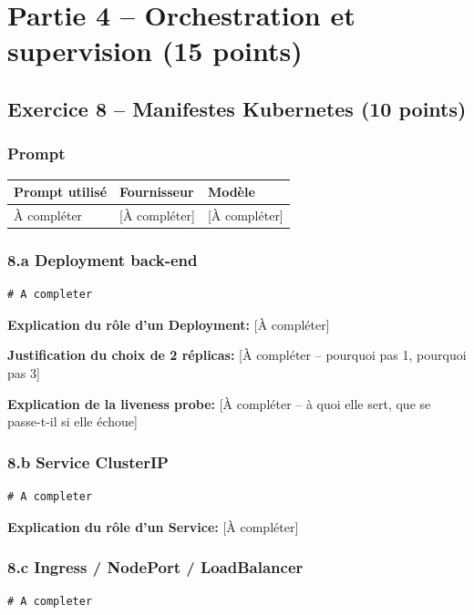 \documentclass[11pt,a4paper]{article}
\begin{document}
\newpage
\section{Partie 4 -- Orchestration et supervision (15 points)}

\subsection{Exercice 8 -- Manifestes Kubernetes (10 points)}
\subsubsection*{Prompt}
\begin{longtable}{p{}p{}p{}}
\toprule
Prompt utilisé & Fournisseur & Modèle \\
\midrule
À compléter & [À compléter] & [À compléter] \\
\bottomrule
\end{longtable}

\subsubsection*{8.a Deployment back-end}
\begin{lstlisting}[language={},title=k8s/deployment.yaml]
# A completer
\end{lstlisting}

\noindent\textbf{Explication du rôle d'un Deployment:} [À compléter]

\noindent\textbf{Justification du choix de 2 réplicas:} [À compléter -- pourquoi pas 1, pourquoi pas 3]

\noindent\textbf{Explication de la liveness probe:} [À compléter -- à quoi elle sert, que se passe-t-il si elle échoue]

\subsubsection*{8.b Service ClusterIP}
\begin{lstlisting}[language={},title=k8s/service.yaml]
# A completer
\end{lstlisting}

\noindent\textbf{Explication du rôle d'un Service:} [À compléter]

\subsubsection*{8.c Ingress / NodePort / LoadBalancer}
\begin{lstlisting}[language={},title=k8s/ingress.yaml]
# A completer
\end{lstlisting}
\end{document}
